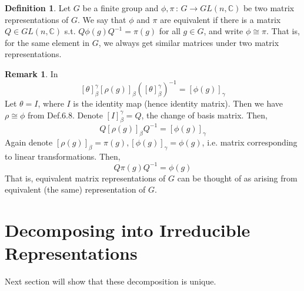 \documentclass{book}
\newcommand{\C}{\mathbb{C}}
\theoremstyle{definition}
\newtheorem{definition}[lemma]{Definition}
\theoremstyle{remarkstyle}
\newtheorem*{remark}{Remark}%
\begin{document}
\begin{definition}
    Let $G$ be a finite group and $\phi, \pi\,:\, G\rightarrow GL(n,\C) $ be two matrix representations of $G$. We say that $\phi$ and $\pi$ are equivalent if there is a matrix $Q\in GL(n,\C)$ s.t. $Q\phi(g)Q^{-1} = \pi(g) $ for all $g\in G$, and write $\phi\cong\pi$. That is, for the same element in $G$, we always get similar matrices under two matrix representations.
\end{definition}
\begin{remark}
    In 
    $$
    [\theta]^\gamma_\beta[\rho(g)]_\beta([\theta]^\gamma_\beta)^{-1} = [\phi(g)]_\gamma
    $$
    Let $\theta = I$, where $I$ is the identity map (hence identity matrix). Then we have $\rho\cong\phi$ from Def.6.8. Denote $[I]^\gamma_\beta = Q$, the change of basis matrix. Then,
    $$
    Q[\rho(g)]_\beta Q^{-1} = [\phi(g)]_\gamma
    $$
    Again denote $[\rho(g)]_\beta=\pi(g), [\phi(g)]_\gamma = \phi(g)$, i.e. matrix corresponding to linear transformations. Then, 
    $$
    Q\pi(g)Q^{-1} = \phi(g)
    $$
    That is, equivalent matrix representations of $G$ can be thought of as arising from equivalent (the same) representation of $G$. \newline
\end{remark}



\section{Decomposing into Irreducible Representations}
Next section will show that these decomposition is unique. \newline
\end{document}
